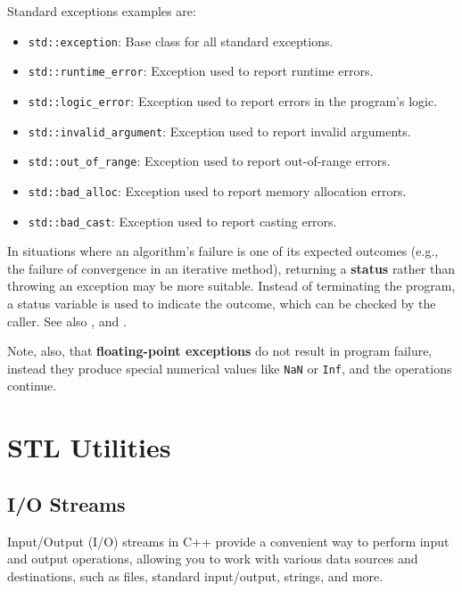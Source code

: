 Standard exceptions examples are:
\begin{itemize}
    \item \texttt{std::exception}: Base class for all standard exceptions.
    \item \texttt{std::runtime\_error}: Exception used to report runtime errors.
    \item \texttt{std::logic\_error}: Exception used to report errors in the program's logic.
    \item \texttt{std::invalid\_argument}: Exception used to report invalid arguments.
    \item \texttt{std::out\_of\_range}: Exception used to report out-of-range errors.
    \item \texttt{std::bad\_alloc}: Exception used to report memory allocation errors.
    \item \texttt{std::bad\_cast}: Exception used to report casting errors.
\end{itemize}

\begin{observationblock}
    In situations where an algorithm's failure is one of its expected outcomes (e.g., the failure of
    convergence in an iterative method), returning a \textbf{status} rather than throwing an exception may be
    more suitable. Instead of terminating the program, a status variable is used to indicate the
    outcome, which can be checked by the caller. See also  ,  and .
\end{observationblock}

Note, also, that \textbf{floating-point exceptions} do not result in program failure, instead they produce special numerical values like \texttt{NaN} or \texttt{Inf}, and the operations continue. 


\section{STL Utilities}

\subsection{I/O Streams}

Input/Output (I/O) streams in C++ provide a convenient way to perform input and output
operations, allowing you to work with various data sources and destinations, such as files,
standard input/output, strings, and more.

